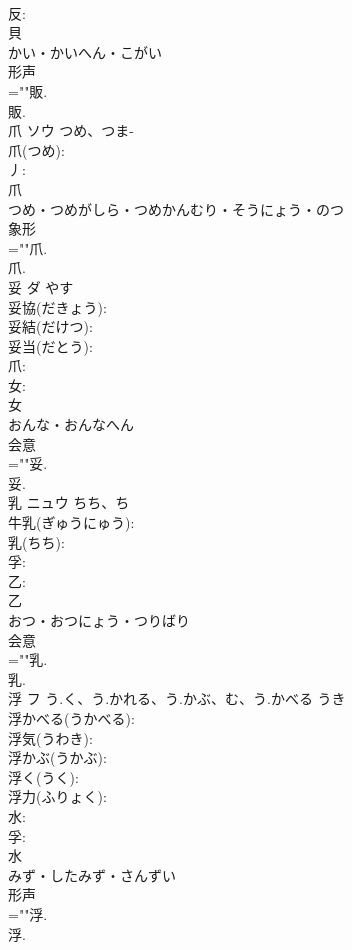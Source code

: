 \documentclass[8pt]{extreport}
\begin{document}
\begin{CJK}{UTF8}{min}
\\	反: 
\\	貝	
\\	かい・かいへん・こがい	
\\	形声 
\\	=""販.
\\	販.
\\	爪	ソウ	つめ、つま-		
\\	爪(つめ): 
\\	丿: 
\\	爪	
\\	つめ・つめがしら・つめかんむり・そうにょう・のつ	
\\	象形 
\\	=""爪.
\\	爪.
\\	妥	ダ		やす	
\\	妥協(だきょう): 
\\	妥結(だけつ): 
\\	妥当(だとう): 
\\	爪: 
\\	女: 
\\	女	
\\	おんな・おんなへん	
\\	会意 
\\	=""妥.
\\	妥.
\\	乳	ニュウ	ちち、ち		
\\	牛乳(ぎゅうにゅう): 
\\	乳(ちち): 
\\	孚: 
\\	乙: 
\\	乙	
\\	おつ・おつにょう・つりばり	
\\	会意 
\\	=""乳.
\\	乳.
\\	浮	フ	う.く、う.かれる、う.かぶ、む、う.かべる	うき	
\\	浮かべる(うかべる): 
\\	浮気(うわき): 
\\	浮かぶ(うかぶ): 
\\	浮く(うく): 
\\	浮力(ふりょく): 
\\	水: 
\\	孚: 
\\	水	
\\	みず・したみず・さんずい	
\\	形声 
\\	=""浮.
\\	浮.

\end{CJK}
\end{document}
